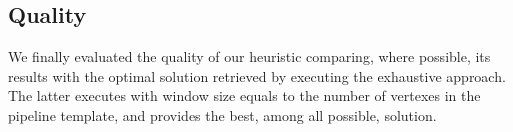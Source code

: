 \subsection{Quality}\label{subsec:experiments_quality}
We finally evaluated the quality of our heuristic comparing, where possible, its results with the optimal solution retrieved by executing the exhaustive approach. The latter executes with window size equals to the number of vertexes in the pipeline template, and provides the best, among all possible, solution.





